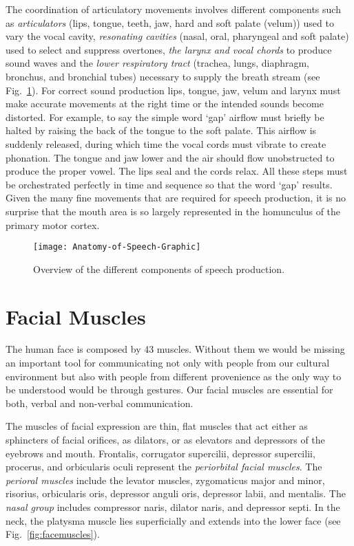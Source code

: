The coordination of articulatory movements involves different components such as \textit{articulators} (lips, tongue, teeth, jaw, hard and soft palate (velum)) used to vary the vocal cavity, \textit{resonating cavities} (nasal, oral, pharyngeal and soft palate) used to select and suppress overtones, \textit{the larynx and vocal chords} to produce sound waves and the \textit{lower respiratory tract} (trachea, lungs, diaphragm, bronchus, and bronchial tubes) necessary to supply the breath stream (see Fig.~\ref{fig:speechmuscles})\cite{PhonManual}. 
For correct sound production lips, tongue, jaw, velum and larynx must make accurate movements at the right time or the intended sounds become distorted. For example, to say the simple word `gap' airflow must briefly be halted by raising the back of the tongue to the soft palate. This airflow is suddenly released, during which time the vocal cords must vibrate to create phonation. The tongue and jaw lower and the air should flow unobstructed to produce the proper vowel. The lips seal and the cords relax. All these steps must be orchestrated perfectly in time and sequence so that the word `gap' results. Given the many fine movements that are required for speech production, it is no surprise that the mouth area is so largely represented in the homunculus of the primary motor cortex.
 


\begin{figure}
    \centering
    \texttt{[image: Anatomy-of-Speech-Graphic]}
    \caption{Overview of the different components of speech production.}
    \label{fig:speechmuscles}
\end{figure}



\section{Facial Muscles}
\label{sec:faceAnatomy}

The human face is composed by 43 muscles. Without them we would be missing an important tool for communicating not only with people from our cultural environment but also with people from different provenience as the only way to be understood would be through gestures. Our facial muscles are essential for both, verbal and non-verbal communication.\par 

The muscles of facial expression are thin, flat muscles that act either as sphincters of facial orifices, as dilators, or as elevators and depressors of the eyebrows and mouth. Frontalis, corrugator supercilii, depressor supercilii, procerus, and orbicularis oculi represent the \textit{periorbital facial muscles}. The \textit{perioral muscles} include the levator muscles, zygomaticus major and minor, risorius, orbicularis oris, depressor anguli oris, depressor labii, and mentalis. The \textit{nasal group} includes compressor naris, dilator naris, and depressor septi. In the neck, the platysma muscle lies superficially and extends into the lower face (see Fig.~\ref{fig:facemuscles}).\cite{Prendergast2013anatomy}


